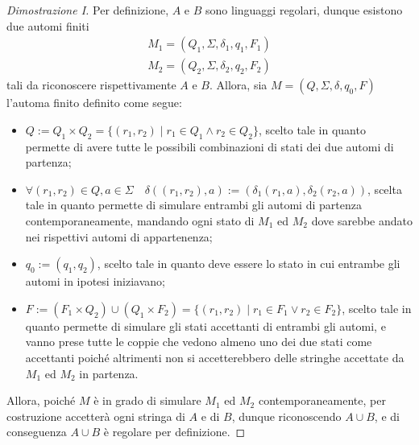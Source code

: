 \documentclass[a4paper, 12pt]{report}
\begin{document}
    \begin{proof}[Dimostrazione I]
        Per definizione, $A$ e $B$ sono linguaggi regolari, dunque esistono due automi finiti $$\left. \begin{array}{c}M_1 = (Q_1, \Sigma, \delta_1, q_1, F_1) \\ M_2 = (Q_2, \Sigma, \delta_2, q_2, F_2)\end{array} \right.$$ tali da riconoscere rispettivamente $A$ e $B$. Allora, sia $M = (Q, \Sigma, \delta, q_0, F)$ l'automa finito definito come segue:

        \begin{itemize}
            \item $Q := Q_1 \times Q_2 = \{(r_1, r_2) \mid r_1 \in Q_1 \land r_2 \in Q_2\}$, scelto tale in quanto permette di avere tutte le possibili combinazioni di stati dei due automi di partenza;
            \item $\forall (r_1, r_2) \in Q, a \in \Sigma \quad \delta((r_1, r_2), a) := (\delta_1(r_1, a), \delta_2(r_2, a))$, scelta tale in quanto permette di simulare entrambi gli automi di partenza contemporaneamente, mandando ogni stato di $M_1$ ed $M_2$ dove sarebbe andato nei rispettivi automi di appartenenza;
            \item $q_0 := (q_1, q_2)$, scelto tale in quanto deve essere lo stato in cui entrambe gli automi in ipotesi iniziavano;
            \item $F := (F_1 \times Q_2) \cup (Q_1 \times F_2) = \{(r_1, r_2) \mid r_1 \in F_1 \lor r_2 \in F_2\}$, scelto tale in quanto permette di simulare gli stati accettanti di entrambi gli automi, e vanno prese tutte le coppie che vedono almeno uno dei due stati come accettanti poiché altrimenti non si accetterebbero delle stringhe accettate da $M_1$ ed $M_2$ in partenza.
        \end{itemize}

        Allora, poiché $M$ è in grado di simulare $M_1$ ed $M_2$ contemporaneamente, per costruzione accetterà ogni stringa di $A$ e di $B$, dunque riconoscendo $A \cup B$, e di conseguenza $A \cup B$ è regolare per definizione.
    \end{proof}
\end{document}
